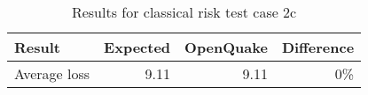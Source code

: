 \begin{table}[htbp]

\centering
\begin{tabular}{ l r r r }

\hline
\rowcolor{anti-flashwhite}
\bf{Result} & \bf{Expected} & \bf{OpenQuake} & \bf{Difference}\\
\hline
Average loss & 9.11 & 9.11 & 0\% \\
\hline
\end{tabular}

\caption{Results for classical risk test case 2c}
\label{tab:result-classical-risk-2c}
\end{table}
